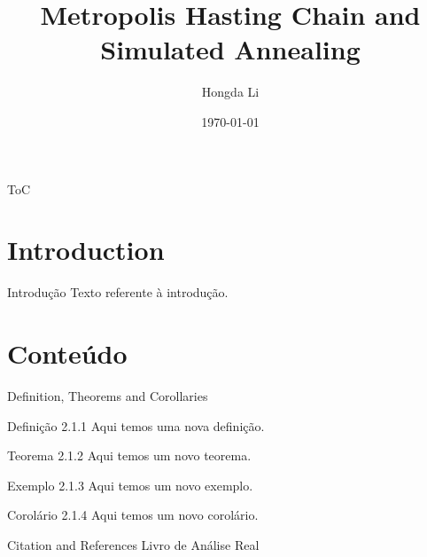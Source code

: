 \documentclass[11pt]{beamer}
\author{Hongda Li}
\title{Metropolis Hasting Chain and Simulated Annealing}
\institute[]{UBC Okanagan}
\date{\today}
\begin{document}
\begin{frame}
    \titlepage
\end{frame}

\begin{frame}{ToC}
    \tableofcontents
\end{frame}

\section{Introduction}
    \begin{frame}{Introdução}
        Texto referente à introdução.
    \end{frame}

\section{Conteúdo}
    \begin{frame}{Definition, Theorems and Corollaries}
        \begin{block}{Definição 2.1.1}
        Aqui temos uma nova definição.
        \end{block}

        \begin{block}{Teorema 2.1.2}
        Aqui temos um novo teorema.
        \end{block}

        \begin{block}{Exemplo 2.1.3}
        Aqui temos um novo exemplo.
        \end{block}

        \begin{block}{Corolário 2.1.4}
        Aqui temos um novo corolário.
        \end{block}
    \end{frame}
    \begin{frame}{Citation and References}
        Livro de Análise Real~\cite{lima2004analise}
    \end{frame}
\end{document}
